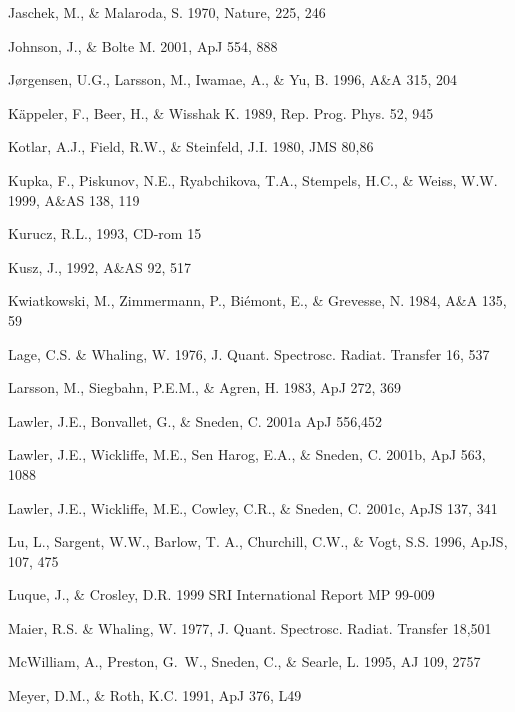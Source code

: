 \documentclass{aa}
\begin{document}
\begin{thebibliography}{}
    Jaschek, M., \& Malaroda, S. 1970, Nature, 225, 246

    Johnson, J., \& Bolte M. 2001, ApJ 554, 888 

     J\o rgensen, U.G., Larsson, M., Iwamae,
A., \& Yu, B. 1996, A\&A 315, 204

    K\"appeler, F., Beer, H., \& Wisshak K.
   1989, Rep. Prog. Phys. 52, 945

    Kotlar, A.J., Field, R.W., \& Steinfeld, J.I. 
1980, JMS 80,86

    Kupka, F., Piskunov, N.E., Ryabchikova, T.A.,
   Stempels, H.C., \& Weiss, W.W. 1999, A\&AS 138, 119

    Kurucz, R.L., 1993, CD-rom 15

     Kusz, J., 1992, A\&AS 92, 517 

     Kwiatkowski, M., Zimmermann, P.,
    Bi\'emont, E., \& Grevesse, N. 1984, A\&A 135, 59

     Lage, C.S. \& Whaling, W. 1976,
    J. Quant. Spectrosc. Radiat. Transfer 16, 537

    Larsson, M., Siegbahn, P.E.M., \& Agren, H. 
1983, ApJ 272, 369

     Lawler, J.E., Bonvallet, G., \& Sneden,
    C. 2001a ApJ 556,452 

     Lawler, J.E., Wickliffe, M.E., Sen
    Harog, E.A., \& Sneden,  C. 2001b, ApJ 563, 1088  

     Lawler, J.E., Wickliffe, M.E., Cowley,
    C.R., \& Sneden, C. 2001c, ApJS 137, 341  

     Lu, L., Sargent, W.W., Barlow, T. A.,
    Churchill, C.W., \& Vogt, S.S. 1996, ApJS, 107, 475 

    Luque, J., \& Crosley, D.R. 1999 SRI International 
Report MP 99-009 

     Maier, R.S. \& Whaling, W. 1977,
    J. Quant. Spectrosc. Radiat. Transfer 18,501  

    McWilliam, A., Preston, G.~W., Sneden,
   C., \& Searle, L. 1995, AJ 109, 2757

    Meyer, D.M., \& Roth, K.C. 1991, ApJ 376, L49


\end{thebibliography}
\end{document}
